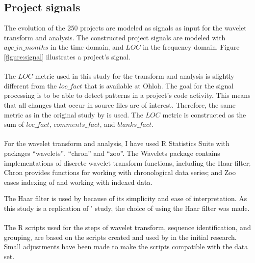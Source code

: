 \subsection{Project signals}
\label{section:signals}
The evolution of the 250 projects are modeled as signals as input for the
wavelet transform and analysis. The constructed project signals are modeled with
$age\_in\_months$ in the time domain, and $LOC$ in the frequency domain. Figure
\ref{figure:signal} illustrates a project's signal.



\paragraph{}
The $LOC$ metric used in this study for the transform and analysis is slightly
different from the $loc\_fact$ that is available at Ohloh. The goal for the
signal processing is to be able to detect patterns in a project's code
activity. This means that all changes that occur in source files are of
interest. Therefore, the same metric as in the original study by
\citet{karus2013} is used. The $LOC$ metric is constructed as the sum of
$loc\_fact$, $comments\_fact$, and $blanks\_fact$.

\paragraph{}
For the wavelet transform and analysis, I have used R Statistics Suite
with packages ``wavelets'', ``chron'' and ``zoo''. The Wavelets package
contains implementations of discrete wavelet transform functions, including
the Haar filter; Chron provides functions for working with chronological data
series; and Zoo eases indexing of and working with indexed data.

The Haar filter is used by \citet{karus2013} because of its simplicity and ease
of interpretation. As this study is a replication of \citeauthor{karus2013}'
study, the choice of using the Haar filter was made.

\paragraph{}
The R scripts used for the steps of wavelet transform, sequence identification,
and grouping, are based on the scripts created and used by
\citeauthor{karus2013} in the initial research. Small adjustments have been
made to make the scripts compatible with the data set.

